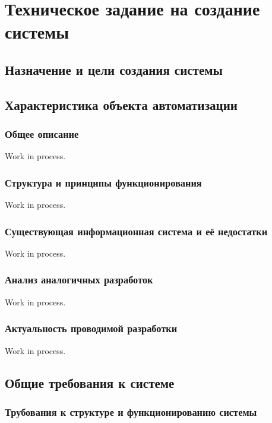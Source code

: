 \section{Техническое задание на создание системы}

\subsection{Назначение и цели создания системы}

\subsection{Характеристика объекта автоматизации}

\subsubsection{Общее описание}

Work in process.

\subsubsection{Структура и принципы функционирования}

Work in process.

\subsubsection{Существующая информационная система и её недостатки}

Work in process.

\subsubsection{Анализ аналогичных разработок}

Work in process.

\subsubsection{Актуальность проводимой разработки}

Work in process.

\subsection{Общие требования к системе}

\subsubsection{Трубования к структуре и функционированию системы}

